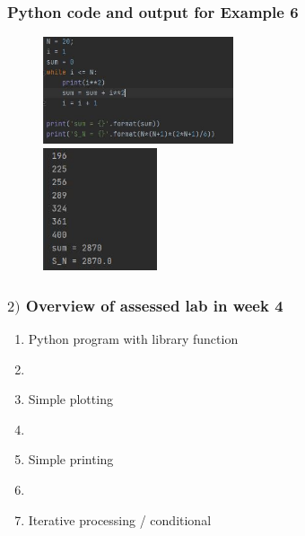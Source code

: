 \documentclass[english,14pt]{beamer}
\begin{document}

\begin{frame}[fragile]

\frametitle{Python code and output for Example 6}

\begin{figure}[ht]
	\centering
	\includegraphics[width=0.5\textwidth]{figures/Week3ThuEx6a}\\
	\vspace*{2mm}
	\includegraphics[width=0.3\textwidth]{figures/Week3ThuEx6b}
\end{figure}

\end{frame}


\begin{frame}[fragile]

\frametitle{$2)$ Overview of assessed lab in week 4}

\begin{enumerate}
	\item Python program with library function
	\item[]
	\item Simple plotting
	\item[]
	\item Simple printing
	\item[]
	\item Iterative processing / conditional
\end{enumerate}

\end{frame}
\end{document}
